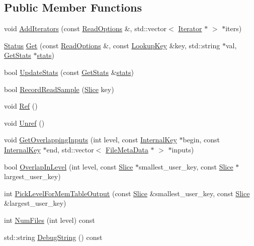 \subsection*{Public Member Functions}
\begin{DoxyCompactItemize}
\item 
void \mbox{\hyperlink{classleveldb_1_1_version_a035a0fa5bfe7ab84a711b1138b0b9a3d}{Add\+Iterators}} (const \mbox{\hyperlink{structleveldb_1_1_read_options}{Read\+Options}} \&, std\+::vector$<$ \mbox{\hyperlink{classleveldb_1_1_iterator}{Iterator}} $\ast$ $>$ $\ast$iters)
\item 
\mbox{\hyperlink{classleveldb_1_1_status}{Status}} \mbox{\hyperlink{classleveldb_1_1_version_a42c439d4a2a767fe281c7a75d4255038}{Get}} (const \mbox{\hyperlink{structleveldb_1_1_read_options}{Read\+Options}} \&, const \mbox{\hyperlink{classleveldb_1_1_lookup_key}{Lookup\+Key}} \&key, std\+::string $\ast$val, \mbox{\hyperlink{structleveldb_1_1_version_1_1_get_stats}{Get\+Stats}} $\ast$\mbox{\hyperlink{db__bench_8cc_a5925d216740c89f43482df806fd14e8c}{stats}})
\item 
bool \mbox{\hyperlink{classleveldb_1_1_version_a7e5b8451deb7c4b9006fd9d5ccfc2cef}{Update\+Stats}} (const \mbox{\hyperlink{structleveldb_1_1_version_1_1_get_stats}{Get\+Stats}} \&\mbox{\hyperlink{db__bench_8cc_a5925d216740c89f43482df806fd14e8c}{stats}})
\item 
bool \mbox{\hyperlink{classleveldb_1_1_version_a8b9e51b3d0503fe5868f656356557ded}{Record\+Read\+Sample}} (\mbox{\hyperlink{classleveldb_1_1_slice}{Slice}} key)
\item 
void \mbox{\hyperlink{classleveldb_1_1_version_ad237b446c7f7d9e63c4b7c162d6f0064}{Ref}} ()
\item 
void \mbox{\hyperlink{classleveldb_1_1_version_a3f623697f625d4740d5b273c0bf6223a}{Unref}} ()
\item 
void \mbox{\hyperlink{classleveldb_1_1_version_afd86dffba7ce5229778bddd546517392}{Get\+Overlapping\+Inputs}} (int level, const \mbox{\hyperlink{classleveldb_1_1_internal_key}{Internal\+Key}} $\ast$begin, const \mbox{\hyperlink{classleveldb_1_1_internal_key}{Internal\+Key}} $\ast$end, std\+::vector$<$ \mbox{\hyperlink{structleveldb_1_1_file_meta_data}{File\+Meta\+Data}} $\ast$ $>$ $\ast$inputs)
\item 
bool \mbox{\hyperlink{classleveldb_1_1_version_a7945e88b8a4f2f7b6f3201cb3d791f1e}{Overlap\+In\+Level}} (int level, const \mbox{\hyperlink{classleveldb_1_1_slice}{Slice}} $\ast$smallest\+\_\+user\+\_\+key, const \mbox{\hyperlink{classleveldb_1_1_slice}{Slice}} $\ast$largest\+\_\+user\+\_\+key)
\item 
int \mbox{\hyperlink{classleveldb_1_1_version_ac3b623319110ed2a9491723dd4675431}{Pick\+Level\+For\+Mem\+Table\+Output}} (const \mbox{\hyperlink{classleveldb_1_1_slice}{Slice}} \&smallest\+\_\+user\+\_\+key, const \mbox{\hyperlink{classleveldb_1_1_slice}{Slice}} \&largest\+\_\+user\+\_\+key)
\item 
int \mbox{\hyperlink{classleveldb_1_1_version_a3860dac2fe3c61ef20edb8482a2a3746}{Num\+Files}} (int level) const
\item 
std\+::string \mbox{\hyperlink{classleveldb_1_1_version_abf1f1702c439aea453b041d5db6b7e63}{Debug\+String}} () const
\end{DoxyCompactItemize}
